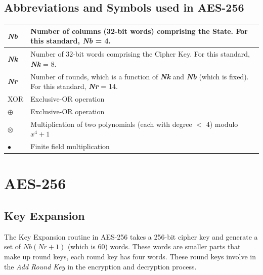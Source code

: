 \documentclass[a4paper, 10pt]{article}
\begin{document}
\begin{multicols}{2}
            \subsection{Abbreviations and Symbols used in AES-256}
                    \setlength{\tabcolsep}{5pt} %
                    \renewcommand{\arraystretch}{1.5} %
                    \noindent
                        \begin{tabular}{m{1cm} m{6.5cm}}
                            \textbf{\textit{Nb}} & Number of columns (32-bit words) comprising the State. For this
                            standard, \textbf{\textit{Nb}} = 4.\\
                            \hline
                            \textbf{\textit{Nk}} & Number of 32-bit words comprising the Cipher Key. For this standard, \textbf{\textit{Nk}} = 8.\\
                            \hline
                            \textbf{\textit{Nr}} & Number of rounds, which is a function of \textbf{\textit{Nk}} and \textbf{\textit{Nb}} (which is
                            fixed). For this standard, \textbf{\textit{Nr}} = 14.\\
                            \hline
                            XOR & Exclusive-OR operation\\
                            \hline
                            $\oplus$ & Exclusive-OR operation\\
                            \hline
                            $\otimes$ & Multiplication of two polynomials (each with degree $<$ 4) modulo $x^{4}+1$\\
                            \hline
                            $\bullet$ & Finite field multiplication\\
                        \end{tabular}

        \section{AES-256}
            \subsection{Key Expansion}
                The Key Expansion routine in AES-256 takes a 256-bit cipher key and generate a set of $Nb(Nr+1)$ (which is 60) words. These words are smaller parts that make up round keys, each round key has four words. These round keys involve in the \textit{Add Round Key} in the encryption and decryption process.


\end{multicols}
\end{document}
